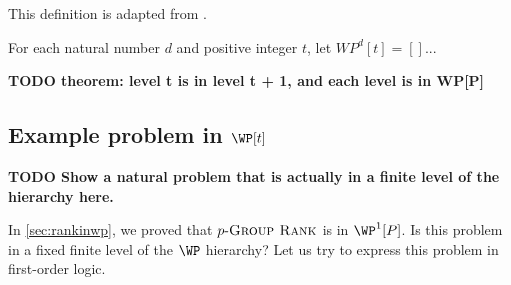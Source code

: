 \documentclass{article}
\newcommand{\todo}[1]{\textbf{TODO #1}}
\newcommand{\dash}{\textnormal{-}}
\newcommand{\pgrouprank}{p\dash\textsc{Group Rank}}
\begin{document}
This definition is adapted from \autocite[Definition~5.1]{fg06}.

\begin{definition}
  For each natural number $d$ and positive integer $t$, let $WP^d[t] = []$...
\end{definition}

\todo{theorem: level t is in level t + 1, and each level is in WP[P]}




\subsection{Example problem in \texorpdfstring{$\WP[t]$}{WP[t]}}

\todo{Show a natural problem that is actually in a finite level of the hierarchy here.}

In \autoref{sec:rankinwp}, we proved that $\pgrouprank$ is in $\WP^1[P]$.
Is this problem in a fixed finite level of the $\WP$ hierarchy?
Let us try to express this problem in first-order logic.
\end{document}
